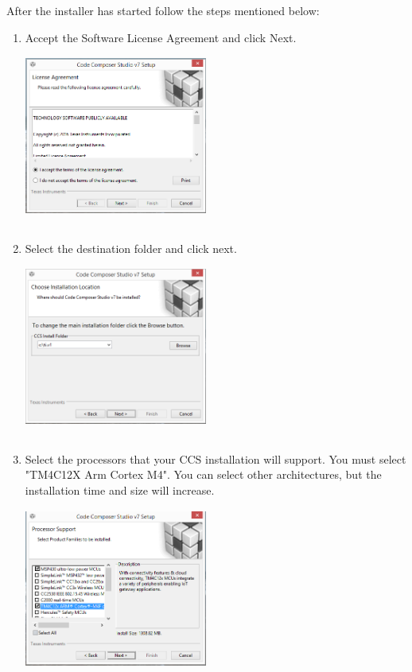 \documentclass[a4paper,10pt,oneside]{article}
\begin{document}
				{After the installer has started follow the steps mentioned below:\\
				\begin{enumerate}
					\item Accept the Software License Agreement and click Next.\\
							{\centering
							\includegraphics[width=6cm, height=6cm]{CCSInstall1}}
					\item Select the destination folder and click next.\\
							{\centering
							\includegraphics[width=6cm, height=6cm]{CCSInstall2}}
					\item Select the processors that your CCS installation will support. You
						must select "TM4C12X Arm Cortex M4". You can select other architectures, but the installation time and size will increase.\\{\centering
							\includegraphics[width=6cm, height=6cm]{CCSInstall3}}

\end{enumerate}}
\end{document}
